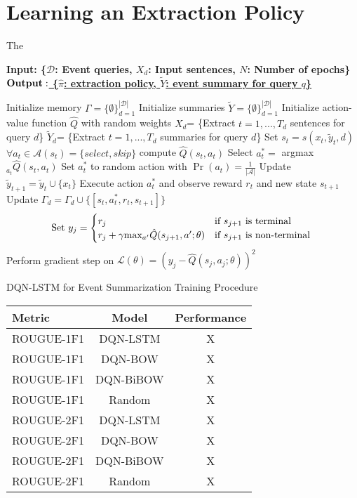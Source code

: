 \documentclass[12pt]{article}
\begin{document}
\section{Learning an Extraction Policy}
The 
\begin{algorithm}
    \bf{Input:} { \rm  \{$\mathcal{D}$: Event queries, $X_d$: Input sentences, $N$: Number of epochs\} } \\
    \underline{$\bf{Output: }$ \rm \{$\hat{\pi}$: extraction policy, $\tilde{Y}$: event summary for query $q$\} }
\begin{algorithmic}[1]
\STATE \rm Initialize memory $\Gamma =  \{\emptyset \}^{\mathcal{|D|}}_{d=1}$
\STATE \rm Initialize summaries $\tilde{Y} = \{\emptyset \}^{\mathcal{|D|}}_{d=1} $
\STATE \rm Initialize action-value function $\hat{Q}$ with random weights
		\STATE $X_{d}$= \{Extract $t=1,...,T_d$ sentences for query $d$\}
		\STATE $\tilde{Y}_{d}$= \{Extract $t=1,...,T_d$ summaries for query $d$\}
			\STATE Set $s_t = s(x_t, \tilde{y}_t, d)$
			\STATE $ \forall a_t \in \mathcal{A}(s_t) = \{select, skip\}$ \textrm{compute} $\hat{Q}(s_t, a_t)$
			\STATE Select $a^{*}_t =$ argmax$_{a_{t}}\hat{Q}(s_t, a_t)$
				\STATE  Set $a^{*}_t $ to random action with $\Pr(a_t) =\frac{1}{| \mathcal{A} |} $
			\ENDIF
				\STATE Update $\tilde{y}_{t+1} = \tilde{y}_t \cup  \{ x_t \} $
			\ENDIF	
			\STATE Execute action $a^{*}_t$ and observe reward $r_t$ and new state $s_{t+1}$
			\STATE Update $\Gamma_d = \Gamma_d \cup \{ [s_t, a^{*}_t, r_t, s_{t+1}]\}$
		\ENDFOR
	\ENDFOR
		\STATE \[\textrm{Set } y_j= 
					\begin{cases}
						r_j              								& \text{if $s_{j+1}$ is terminal } \\
					     	r_j + \gamma $max$_{a'}\hat{Q}(s_{j+1}, a'; \theta) 	& \text{if $s_{j+1}$ is non-terminal } 
					\end{cases} 
					\]
        		\STATE Perform gradient step on $\mathcal{L}(\theta) = (y_j - \hat{Q}(s_j, a_j; \theta))^2$
		\ENDFOR
\ENDFOR
  \end{algorithmic}
    \caption{DQN-LSTM for Event Summarization Training Procedure}
\end{algorithm}


\begin{tabular}{ l | c | c  }
	\hline
	Metric  & Model  & Performance\\ \hline \hline
  	ROUGUE-1F1 & DQN-LSTM  & X \\
  	ROUGUE-1F1 & DQN-BOW  & X \\
  	ROUGUE-1F1 & DQN-BiBOW  & X \\
  	ROUGUE-1F1 & Random  & X \\ \hline
  	ROUGUE-2F1 & DQN-LSTM  & X \\
  	ROUGUE-2F1 & DQN-BOW  & X \\
  	ROUGUE-2F1 & DQN-BiBOW  & X \\
  	ROUGUE-2F1 & Random  & X \\ \hline
	\hline
\end{tabular}



\newpage


\end{document}

